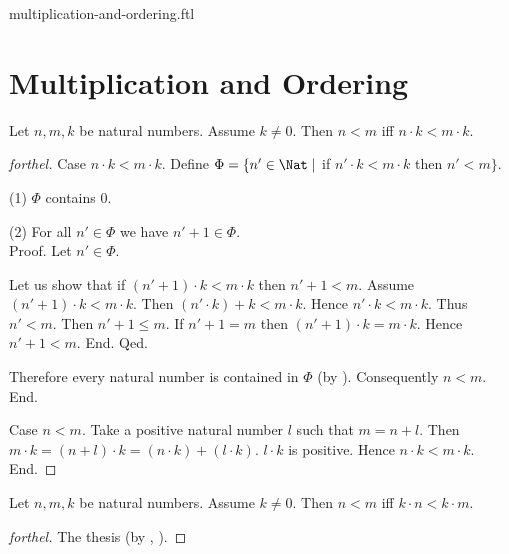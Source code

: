 \documentclass{naproche-library}
\begin{document}
\begin{smodule}{multiplication-and-ordering.ftl}

  \section*{Multiplication and Ordering}

  \begin{proposition}[forthel,id=ARITHMETIC_06_8817333933965312,printid]
    Let $n, m, k$ be natural numbers.
    Assume $k \neq 0$.
    Then $n < m$ iff $n \cdot k < m \cdot k$.
  \end{proposition}
  \begin{proof}[forthel]
    Case $n \cdot k < m \cdot k$.
      Define $\Phi = \{ n' \in \Nat \mid$ if $n' \cdot k < m \cdot k$ then $n' < m \}$.

      (1) $\Phi$ contains $0$.

      (2) For all $n' \in \Phi$ we have $n' + 1 \in \Phi$. \\
      Proof.
        Let $n' \in \Phi$.

        Let us show that if $(n' + 1) \cdot k < m \cdot k$ then $n' + 1 < m$.
          Assume $(n' + 1) \cdot k < m \cdot k$.
          Then $(n' \cdot k) + k < m \cdot k$.
          Hence $n' \cdot k < m \cdot k$.
          Thus $n' < m$.
          Then $n' + 1 \leq m$.
          If $n' + 1 = m$ then $(n' + 1) \cdot k = m \cdot k$.
          Hence $n' + 1 < m$.
        End.
      Qed.

      Therefore every natural number is contained in $\Phi$ (by ).
      Consequently $n < m$.
    End.

    Case $n < m$.
      Take a positive natural number $l$ such that $m = n + l$.
      Then $m \cdot k = (n + l) \cdot k = (n \cdot k) + (l \cdot k)$.
      $l \cdot k$ is positive.
      Hence $n \cdot k < m \cdot k$.
    End.
  \end{proof}

  \begin{corollary}[forthel,id=ARITHMETIC_06_5048640368279552,printid]
    Let $n, m, k$ be natural numbers.
    Assume $k \neq 0$.
    Then $n < m$ iff $k \cdot n < k \cdot m$.
  \end{corollary}
  \begin{proof}[forthel]
    The thesis (by , ).
  \end{proof}


\end{smodule}
\end{document}

